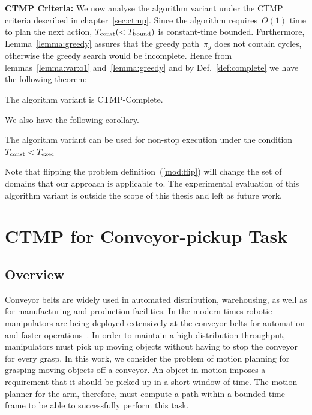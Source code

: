 \documentclass[a4paper]{report}
\begin{document}
\textbf{CTMP Criteria:} We now analyse the algorithm variant under the CTMP criteria described in chapter~\ref{sec:ctmp}. Since the algorithm requires~$O(1)$ time to plan the next action, $T_\textrm{const} (< T_{\textrm{bound}})$ is constant-time bounded.
%
Furthermore, Lemma~\ref{lemma:greedy} assures that the greedy path~$\pi_g$ does not contain cycles, otherwise the greedy search would be incomplete. Hence from lemmas~\ref{lemma:var:o1} and~\ref{lemma:greedy} and by Def.~\ref{def:complete} we have the following theorem:

\vspace{2mm}
\begin{theorem}
	The algorithm variant is CTMP-Complete.
\end{theorem}

We also have the following corollary.

\vspace{2mm}
\begin{cor}
	The algorithm variant can be used for non-stop execution under the condition~$T_{\textrm{const}} < T_{\textrm{exec}}$
\end{cor}

Note that flipping the problem definition~(\ref{mod:flip}) will change the set of domains that our approach is applicable to. The experimental evaluation of this algorithm variant is outside the scope of this thesis and left as future work.

\newpage
\chapter{CTMP for Conveyor-pickup Task}
\label{chap:rss}
\section{Overview}
Conveyor belts are widely used in automated distribution, warehousing, as well as for manufacturing and production facilities. In the modern times robotic manipulators are being deployed extensively at the conveyor belts for automation and faster operations~\cite{zhang2018gilbreth}. In order to maintain a high-distribution throughput, manipulators must pick up moving objects without having to stop the conveyor for every grasp. In this work, we consider the problem of motion planning for grasping moving objects off a conveyor. An object in motion imposes a requirement that it should be picked up in a short window of time. The motion planner for the arm, therefore, must compute a path within a bounded time frame to be able to successfully perform this task.
\end{document}
